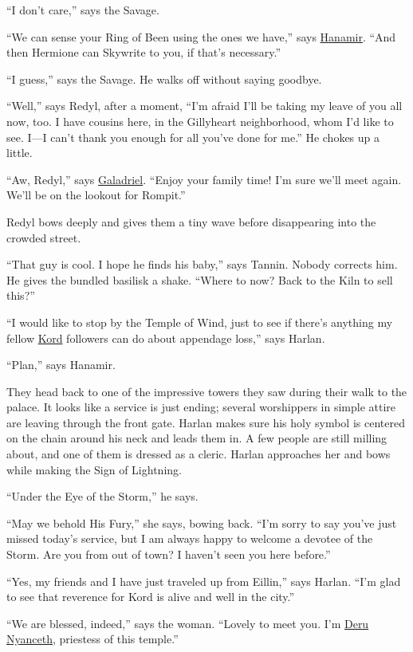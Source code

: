 \documentclass[smalldemyvopaper,11pt,twoside,onecolumn,openright,extrafontsizes]{memoir}
\begin{document}
``I don't care,'' says the Savage.

``We can sense your Ring of Been using the ones we have,'' says
\href{/characters/hanamir/}{Hanamir}. ``And then Hermione can Skywrite
to you, if that's necessary.''

``I guess,'' says the Savage. He walks off without saying goodbye.

``Well,'' says Redyl, after a moment, ``I'm afraid I'll be taking my
leave of you all now, too. I have cousins here, in the Gillyheart
neighborhood, whom I'd like to see. I---I can't thank you enough for all
you've done for me.'' He chokes up a little.

``Aw, Redyl,'' says \href{/characters/galadriel/}{Galadriel}. ``Enjoy
your family time! I'm sure we'll meet again. We'll be on the lookout for
Rompit.''

Redyl bows deeply and gives them a tiny wave before disappearing into
the crowded street.

``That guy is cool. I hope he finds his baby,'' says Tannin. Nobody
corrects him. He gives the bundled basilisk a shake. ``Where to now?
Back to the Kiln to sell this?''

``I would like to stop by the Temple of Wind, just to see if there's
anything my fellow \href{/characters/kord/}{Kord} followers can do about
appendage loss,'' says Harlan.

``Plan,'' says Hanamir.

They head back to one of the impressive towers they saw during their
walk to the palace. It looks like a service is just ending; several
worshippers in simple attire are leaving through the front gate. Harlan
makes sure his holy symbol is centered on the chain around his neck and
leads them in. A few people are still milling about, and one of them is
dressed as a cleric. Harlan approaches her and bows while making the
Sign of Lightning.

``Under the Eye of the Storm,'' he says.

``May we behold His Fury,'' she says, bowing back. ``I'm sorry to say
you've just missed today's service, but I am always happy to welcome a
devotee of the Storm. Are you from out of town? I haven't seen you here
before.''

``Yes, my friends and I have just traveled up from Eillin,'' says
Harlan. ``I'm glad to see that reverence for Kord is alive and well in
the city.''

``We are blessed, indeed,'' says the woman. ``Lovely to meet you. I'm
\href{/characters/deru/}{Deru} \href{/characters/nyanceth/}{Nyanceth},
priestess of this temple.''
\end{document}
